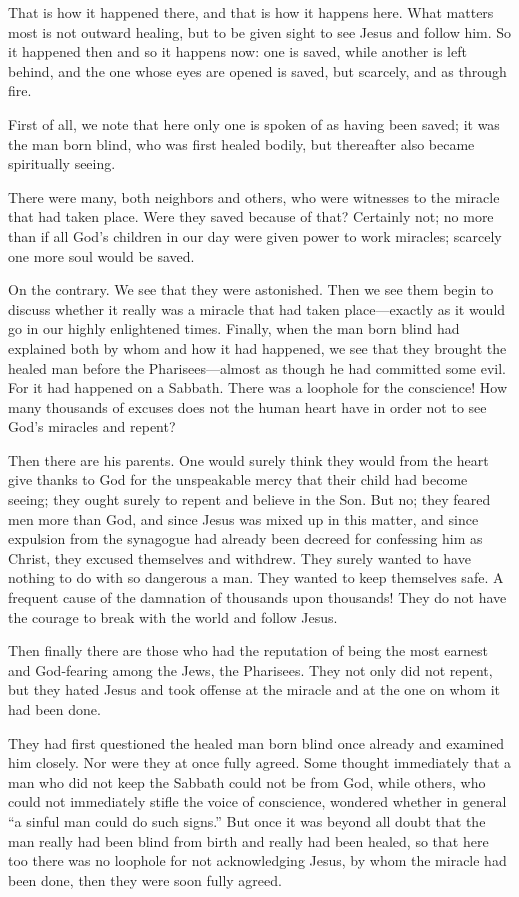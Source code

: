 That is how it happened there, and that is how it happens here. What matters most is not outward healing, but to be given sight to see Jesus and follow him. So it happened then and so it happens now: one is saved, while another is left behind, and the one whose eyes are opened is saved, but scarcely, and as through fire.

First of all, we note that here only one is spoken of as having been saved; it was the man born blind, who was first healed bodily, but thereafter also became spiritually seeing.

There were many, both neighbors and others, who were witnesses to the miracle that had taken place. Were they saved because of that? Certainly not; no more than if all God’s children in our day were given power to work miracles; scarcely one more soul would be saved.

On the contrary. We see that they were astonished. Then we see them begin to discuss whether it really was a miracle that had taken place—exactly as it would go in our highly enlightened times. Finally, when the man born blind had explained both by whom and how it had happened, we see that they brought the healed man before the Pharisees—almost as though he had committed some evil. For it had happened on a Sabbath. There was a loophole for the conscience! How many thousands of excuses does not the human heart have in order not to see God’s miracles and repent?

Then there are his parents. One would surely think they would from the heart give thanks to God for the unspeakable mercy that their child had become seeing; they ought surely to repent and believe in the Son. But no; they feared men more than God, and since Jesus was mixed up in this matter, and since expulsion from the synagogue had already been decreed for confessing him as Christ, they excused themselves and withdrew. They surely wanted to have nothing to do with so dangerous a man. They wanted to keep themselves safe. A frequent cause of the damnation of thousands upon thousands! They do not have the courage to break with the world and follow Jesus.

Then finally there are those who had the reputation of being the most earnest and God-fearing among the Jews, the Pharisees. They not only did not repent, but they hated Jesus and took offense at the miracle and at the one on whom it had been done.

They had first questioned the healed man born blind once already and examined him closely. Nor were they at once fully agreed. Some thought immediately that a man who did not keep the Sabbath could not be from God, while others, who could not immediately stifle the voice of conscience, wondered whether in general “a sinful man could do such signs.” But once it was beyond all doubt that the man really had been blind from birth and really had been healed, so that here too there was no loophole for not acknowledging Jesus, by whom the miracle had been done, then they were soon fully agreed.

